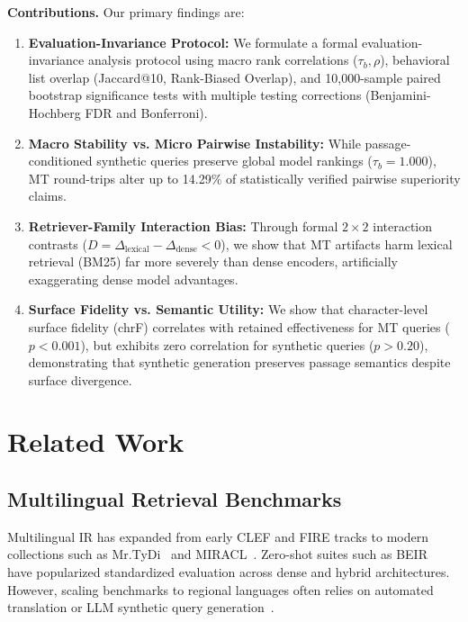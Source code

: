 \documentclass[runningheads]{llncs}
\begin{document}
\noindent\textbf{Contributions.} Our primary findings are:
\begin{enumerate}
    \item \textbf{Evaluation-Invariance Protocol:} We formulate a formal evaluation-invariance analysis protocol using macro rank correlations ($\tau_b, \rho$), behavioral list overlap (Jaccard@10, Rank-Biased Overlap), and 10,000-sample paired bootstrap significance tests with multiple testing corrections (Benjamini-Hochberg FDR and Bonferroni).
    \item \textbf{Macro Stability vs. Micro Pairwise Instability:} While passage-conditioned synthetic queries preserve global model rankings ($\tau_b = 1.000$), MT round-trips alter up to 14.29\% of statistically verified pairwise superiority claims.
    \item \textbf{Retriever-Family Interaction Bias:} Through formal $2 \times 2$ interaction contrasts ($D = \Delta_{\text{lexical}} - \Delta_{\text{dense}} < 0$), we show that MT artifacts harm lexical retrieval (BM25) far more severely than dense encoders, artificially exaggerating dense model advantages.
    \item \textbf{Surface Fidelity vs. Semantic Utility:} We show that character-level surface fidelity (chrF) correlates with retained effectiveness for MT queries ($p < 0.001$), but exhibits zero correlation for synthetic queries ($p > 0.20$), demonstrating that synthetic generation preserves passage semantics despite surface divergence.
\end{enumerate}

\section{Related Work}
\label{sec:related}
\subsection{Multilingual Retrieval Benchmarks}
Multilingual IR has expanded from early CLEF and FIRE tracks to modern collections such as Mr.TyDi~\cite{zhang2021mr} and MIRACL~\cite{zhang2023miracl}. Zero-shot suites such as BEIR~\cite{thakur2021beir} have popularized standardized evaluation across dense and hybrid architectures. However, scaling benchmarks to regional languages often relies on automated translation or LLM synthetic query generation~\cite{bonifacio2022inpars,jeronymo2023inpars}.
\end{document}

